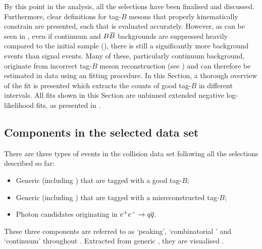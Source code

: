 By this point in the analysis, all the selections have been finalised and discussed.
Furthermore, clear definitions for tag-$B$ mesons that properly kinematically constrain \BtoXsgamma are presented, such that \EB is evaluated accurately.
However, as can be seen in , even if continuum and $B\kern 0.18em\overline{\kern -0.18em B}{}$ backgrounds are suppressed heavily compared to the initial sample (),
there is still a significantly more background events than \BtoXsgamma signal events.
Many of these, particularly continuum background, originate from incorrect tag-$B$ meson reconstruction (see ) and can therefore be estimated in data using an \Mbc fitting procedure.
In this Section, a thorough overview of the \Mbc fit is presented which extracts the counts of good tag-$B$ in different \EB intervals.
All fits shown in this Section are unbinned extended negative log-likelihood fits, as presented in .


\subsection{Components in the selected data set}\label{sec:fitting_components}

There are three types of events in the \epem collision data set following all the selections described so far:
\begin{itemize}
    \item Generic \BB (including \BtoXsgamma) that are tagged with a good tag-$B$;
    \item Generic \BB (including \BtoXsgamma) that are tagged with a misreconstructed tag-$B$;
    \item Photon candidates originating in $e^+e^-\rightarrow q\overline q$.
\end{itemize}
These three components are referred to as `peaking', `combinatorial \BB' and `continuum' throughout .
Extracted from generic \MC, they are visualised .

